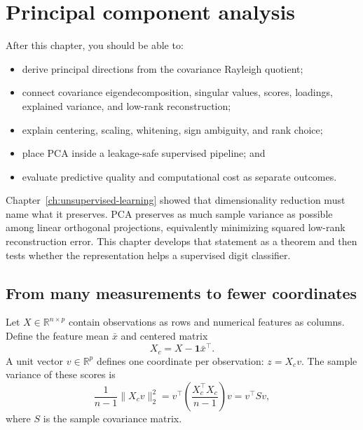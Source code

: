 \chapter{Principal component analysis}
\label{ch:pca}

\begin{learningobjectives}
After this chapter, you should be able to:
\begin{itemize}
  \item derive principal directions from the covariance Rayleigh quotient;
  \item connect covariance eigendecomposition, singular values, scores, loadings,
  explained variance, and low-rank reconstruction;
  \item explain centering, scaling, whitening, sign ambiguity, and rank choice;
  \item place PCA inside a leakage-safe supervised pipeline; and
  \item evaluate predictive quality and computational cost as separate outcomes.
\end{itemize}
\end{learningobjectives}

\begin{chapterconnection}
Chapter~\ref{ch:unsupervised-learning} showed that dimensionality reduction must
name what it preserves. PCA preserves as much sample variance as possible among
linear orthogonal projections, equivalently minimizing squared low-rank
reconstruction error. This chapter develops that statement as a theorem and
then tests whether the representation helps a supervised digit classifier.
\end{chapterconnection}

\section{From many measurements to fewer coordinates}

Let $X\in\mathbb{R}^{n\times p}$ contain observations as rows and numerical
features as columns. Define the feature mean $\bar x$ and centered matrix
\[
X_c=X-\mathbf{1}\bar x^\top.
\]
A unit vector $v\in\mathbb{R}^p$ defines one coordinate per observation:
$z=X_cv$. The sample variance of these scores is
\begin{equation}
\label{eq:pca-rayleigh}
\frac{1}{n-1}\lVert X_cv\rVert_2^2
=v^\top\left(\frac{X_c^\top X_c}{n-1}\right)v
=v^\top S v,
\end{equation}
where $S$ is the sample covariance matrix.

